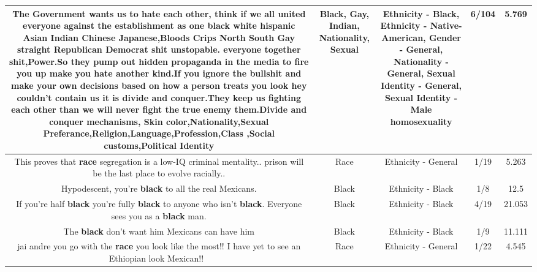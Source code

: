 \documentclass[11pt]{article}
\newlength\mylength
\begin{document}
\begin{center}
\begin{longtable}{|C{.65\mylength}|C{.30\mylength}|C{.12\mylength}|C{.12\mylength}|C{.12\mylength}|}
  \small The Government wants us to hate each other, think if we all united everyone against the establishment as one \textbf{black} white hispanic Asian \textbf{Indian} Chinese Japanese,Bloods Crips North South \textbf{G\textbf{ay}} straight Republican Democrat shit unstopable. everyone together shit,Power.So they pump out hidden propaganda in the media to fire you up make you hate another kind.If you ignore the bullshit and make your own decisions based on how a person treats you look hey couldn't contain us it is divide and conquer.They keep us fighting each other than we will never fight the true enemy them.Divide and conquer mechanisms, Skin color,\textbf{Nationality},\textbf{Sexual} Preferance,Religion,Language,Profession,Class ,Social customs,Political Identity\normalsize   & Black, Gay, Indian, Nationality, Sexual & Ethnicity - Black, Ethnicity - Native-American, Gender - General, Nationality - General, Sexual Identity - General, Sexual Identity - Male homosexuality & 6/104 & 5.769 \\  \hline
  \small This proves that \textbf{race} segregation is a low-IQ criminal mentality.. prison will be the last place to evolve racially..\normalsize   & Race & Ethnicity - General & 1/19 & 5.263 \\  \hline
  \small Hypodescent, you're \textbf{black} to all the real Mexicans.\normalsize   & Black & Ethnicity - Black & 1/8 & 12.5 \\  \hline
  \small If you're half \textbf{black} you're fully \textbf{black} to anyone who isn't \textbf{black}.  Everyone sees you as a \textbf{black} man.\normalsize   & Black & Ethnicity - Black & 4/19 & 21.053 \\  \hline
  \small The \textbf{black} don't want him Mexicans can have him\normalsize   & Black & Ethnicity - Black & 1/9 & 11.111 \\  \hline
  \small jai andre you go with the \textbf{race} you look like the most!! I have yet to see an Ethiopian look Mexican!! 🤣\normalsize   & Race & Ethnicity - General & 1/22 & 4.545 \\  \hline

\end{longtable}
\end{center}
\end{document}
